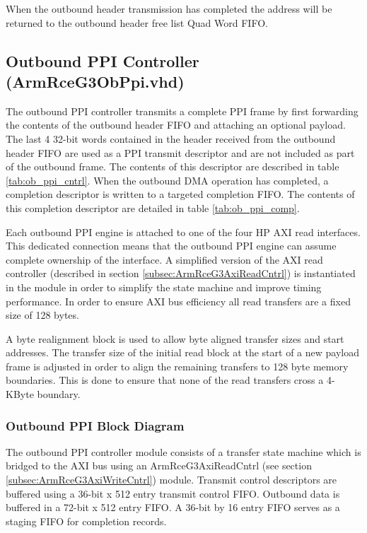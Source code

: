 \documentclass[11pt]{article}
\begin{document}
When the outbound header transmission has completed the address will be returned to the outbound header free list Quad Word FIFO.

\subsection{Outbound PPI Controller (ArmRceG3ObPpi.vhd)}
\label{subsec:ArmRceG3ObPpi}

The outbound PPI controller transmits a complete PPI frame by first forwarding the contents of the outbound header FIFO and attaching an optional
payload. The last 4 32-bit words contained in the header received from the outbound header FIFO are used as a PPI transmit descriptor and are
not included as part of the outbound frame. The contents of this descriptor are described in table \ref{tab:ob_ppi_cntrl}.
When the outbound DMA operation has completed, a completion descriptor is written to a targeted completion FIFO. The contents of this completion 
descriptor are detailed in table \ref{tab:ob_ppi_comp}.

Each outbound PPI engine is attached to one of the four HP AXI read interfaces. This dedicated connection means that the outbound PPI engine
can assume complete ownership of the interface. A simplified version of the AXI read controller (described in section \ref{subsec:ArmRceG3AxiReadCntrl})
is instantiated in the module in order to simplify the state machine and improve timing performance. In order to ensure AXI bus efficiency all read 
transfers are a fixed size of 128 bytes.

A byte realignment block is used to allow byte aligned transfer sizes and start addresses. The transfer size of the initial read block at the start 
of a new payload frame is adjusted in order to align the remaining transfers to 128 byte memory boundaries. This is done to ensure that none of the read 
transfers cross a 4-KByte boundary.

\subsubsection{Outbound PPI Block Diagram}

The outbound PPI controller module consists of a transfer state machine which is bridged to the AXI bus using an ArmRceG3AxiReadCntrl (see section \ref{subsec:ArmRceG3AxiWriteCntrl})
module. Transmit control descriptors are buffered using a 36-bit x 512 entry transmit control FIFO. Outbound data is buffered in a 72-bit x 512 entry FIFO. 
A 36-bit by 16 entry FIFO serves as a staging FIFO for completion records. 
\end{document}
